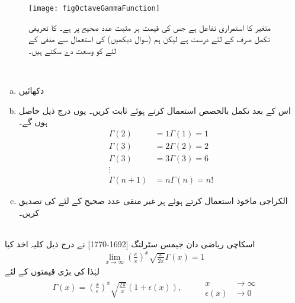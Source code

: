 \begin{figure}
\centering
\texttt{[image: figOctaveGammaFunction]}
\caption{
 متغیر  کا استمراری تفاعل ہے جس کی قیمت ہر مثبت عدد صحیح  پر  ہے۔  کا تعریفی تکمل صرف  کے لئے درست ہے لیکن ہم  (سوال  دیکھیں) کی استعمال سے منفی  کے لئے  کو وسعت دے سکتے ہیں۔ 
}
\label{شکل_تکمل_تراکیب_گیما_تفاعل}
\end{figure}


\\
\begin{enumerate}[a.]
\item
دکھائیں 
\item
اس کے بعد تکمل بالحصص استعمال کرتے ہوئے  ثابت کریں۔ یوں درج ذیل حاصل ہوں گے۔
\begin{align*}
\Gamma(2)&=1\Gamma(1)=1\\
\Gamma(3)&=2\Gamma(2)=2\\
\Gamma(3)&=3\Gamma(3)=6\\
\vdots&\\
\Gamma(n+1)&=n\Gamma(n)=n!
\end{align*}
\item
الکراجی ماخوذ استعمال کرتے ہوئے ہر غیر منفی عدد صحیح  کے لئے  کی تصدیق کریں۔
\end{enumerate}
\\
اسکاچی ریاضی دان جیمس سٹرلنگ [1692-1770] نے  درج ذیل کلیہ اخذ کیا
\begin{align*}
\lim_{x\to\infty}(\tfrac{e}{x})^x\sqrt{\tfrac{x}{2\pi}}\Gamma(x)=1
\end{align*}
لہٰذا  کی بڑی قیمتوں کے لئے
\begin{gather}
\begin{aligned}\label{مساوات_تکمل_تراکیب_سٹرلنگ_ب}
\Gamma(x)=(\tfrac{x}{e})^x\sqrt{\tfrac{2\pi}{x}}(1+\epsilon(x)),
\end{aligned}\quad\quad
\begin{aligned}
x&\to \infty\\
\epsilon(x)&\to 0
\end{aligned}
\end{gather}

